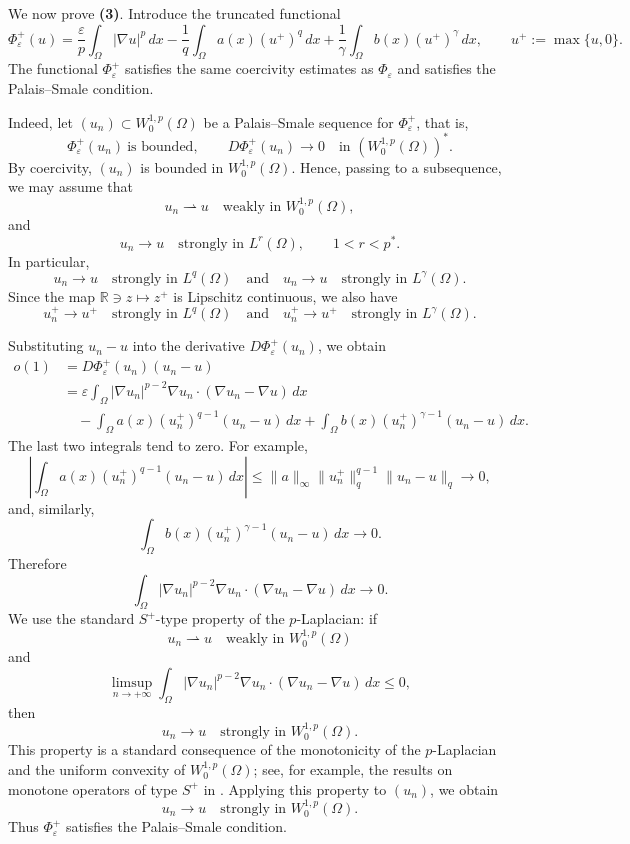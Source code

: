 \documentclass[preprint,11pt]{elsarticle}
\numberwithin{equation}{section}
\begin{document}
\medskip

We now prove \textbf{(3)}. Introduce the truncated functional
\[
\Phi_\varepsilon^+(u)
=
\frac{\varepsilon}{p}\int_\Omega |\nabla u|^p\,dx
-
\frac1q\int_\Omega a(x)(u^+)^q\,dx
+
\frac1\gamma\int_\Omega b(x)(u^+)^\gamma\,dx,
\qquad
u^+:=\max\{u,0\}.
\]
The functional \(\Phi_\varepsilon^+\) satisfies the same coercivity estimates
as \(\Phi_\varepsilon\) and satisfies the Palais--Smale condition.

Indeed, let \((u_n)\subset W^{1,p}_0(\Omega)\) be a Palais--Smale sequence
for \(\Phi_\varepsilon^+\), that is,
\[
\Phi_\varepsilon^+(u_n)\ \text{is bounded},
\qquad
D\Phi_\varepsilon^+(u_n)\to0
\quad\text{in }(W^{1,p}_0(\Omega))^* .
\]
By coercivity, \((u_n)\) is bounded in \(W^{1,p}_0(\Omega)\). Hence, passing
to a subsequence, we may assume that
\[
u_n\rightharpoonup u
\quad\text{weakly in }W^{1,p}_0(\Omega),
\]
and
\[
u_n\to u
\quad\text{strongly in }L^r(\Omega),
\qquad
1<r<p^* .
\]
In particular,
\[
u_n\to u
\quad\text{strongly in }L^q(\Omega)
\quad\text{and}\quad
u_n\to u
\quad\text{strongly in }L^\gamma(\Omega).
\]
Since the map \(\mathbb R\ni z\mapsto z^+\) is Lipschitz continuous, we also
have
\[
u_n^+\to u^+
\quad\text{strongly in }L^q(\Omega)
\quad\text{and}\quad
u_n^+\to u^+
\quad\text{strongly in }L^\gamma(\Omega).
\]

Substituting \(u_n-u\) into the derivative \(D\Phi_\varepsilon^+(u_n)\), we
obtain
\[
\begin{aligned}
	o(1)
	&=
	D\Phi_\varepsilon^+(u_n)(u_n-u)
	\\
	&=
	\varepsilon
	\int_\Omega
	|\nabla u_n|^{p-2}\nabla u_n\cdot
	(\nabla u_n-\nabla u)\,dx
	\\
	&\quad
	-
	\int_\Omega
	a(x)(u_n^+)^{q-1}(u_n-u)\,dx
	+
	\int_\Omega
	b(x)(u_n^+)^{\gamma-1}(u_n-u)\,dx .
\end{aligned}
\]
The last two integrals tend to zero. For example,
\[
\left|
\int_\Omega
a(x)(u_n^+)^{q-1}(u_n-u)\,dx
\right|
\le
\|a\|_\infty
\|u_n^+\|_q^{q-1}
\|u_n-u\|_q
\to0,
\]
and, similarly,
\[
\int_\Omega
b(x)(u_n^+)^{\gamma-1}(u_n-u)\,dx
\to0 .
\]
Therefore
\[
\int_\Omega
|\nabla u_n|^{p-2}\nabla u_n\cdot
(\nabla u_n-\nabla u)\,dx
\to0 .
\]
We use the standard \(S^+\)-type property of the \(p\)-Laplacian: if
\[
u_n\rightharpoonup u
\quad\text{weakly in }W^{1,p}_0(\Omega)
\]
and
\[
\limsup_{n\to+\infty}
\int_\Omega
|\nabla u_n|^{p-2}\nabla u_n\cdot
(\nabla u_n-\nabla u)\,dx
\le0,
\]
then
\[
u_n\to u
\quad\text{strongly in }W^{1,p}_0(\Omega).
\]
This property is a standard consequence of the monotonicity of the
\(p\)-Laplacian and the uniform convexity of \(W^{1,p}_0(\Omega)\); see, for
example, the results on monotone operators of type \(S^+\) in
\cite{DrabekMilota}. Applying this property to \((u_n)\), we obtain
\[
u_n\to u
\quad\text{strongly in }W^{1,p}_0(\Omega).
\]
Thus \(\Phi_\varepsilon^+\) satisfies the Palais--Smale condition.
\end{document}
